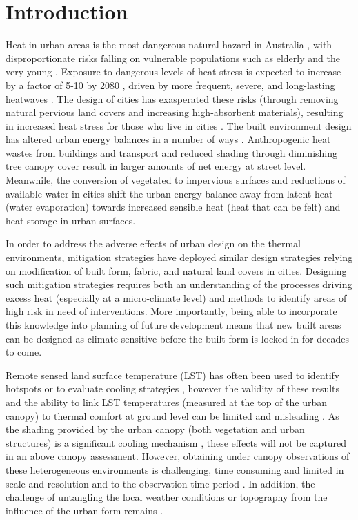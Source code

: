 \documentclass[final,3p,times,authoryear]{elsarticle}
\begin{document}
\section{Introduction}
Heat in urban areas is the most dangerous natural hazard in Australia \citep{Coates2014}, with disproportionate risks falling on vulnerable populations such as elderly and the very young \citep{Nicholls2008}. Exposure to dangerous levels of heat stress is expected to increase by a factor of 5-10 by 2080 \citep{Coffel2018}, driven by more frequent, severe, and long-lasting heatwaves \citep{IPCC2013a}. The design of cities has exasperated these risks (through removing natural pervious land covers and increasing high-absorbent materials), resulting in increased heat stress for those who live in cities \citep{Coutts2012,Martilli2020}. The built environment design has altered urban energy balances in a number of ways \citep{Oke1982}. Anthropogenic heat wastes from buildings and transport and reduced shading through diminishing tree canopy cover result in larger amounts of net energy at street level. Meanwhile, the conversion of vegetated to impervious surfaces and reductions of available water in cities shift the urban energy balance away from latent heat (water evaporation) towards increased sensible heat (heat that can be felt) and heat storage in urban surfaces. 

In order to address the adverse effects of urban design on the thermal environments, mitigation strategies have deployed similar design strategies relying on modification of built form, fabric, and natural land covers in cities. Designing such mitigation strategies requires both an understanding of the processes driving excess heat (especially at a micro-climate level) and methods to identify areas of high risk in need of interventions. More importantly, being able to incorporate this knowledge into planning of future development means that new built areas can be designed as climate sensitive before the built form is locked in for decades to come. 

Remote sensed land surface temperature (LST) has often been used to identify hotspots \citep{Aniello1995} or to evaluate cooling strategies \citep{Zhu2012a,Duncan2018,Manoli2019,Ossola2021}, however the validity of these results and the ability to link LST temperatures (measured at the top of the urban canopy) to thermal comfort at ground level can be limited and misleading  \citep{Coutts2016d}. As the shading provided by the urban canopy (both vegetation and urban structures) is a significant cooling mechanism \citep{Coutts2015,Lee2018,Krayenhoff2021}, these effects will not be captured in an above canopy assessment. However, obtaining under canopy observations of these heterogeneous environments is challenging, time consuming and limited in scale and resolution and to the observation time period \citep{Middel2019a}. In addition, the challenge of untangling the local weather conditions or topography from the influence of the urban form remains \citep{Potgieter2021}.
\end{document}
